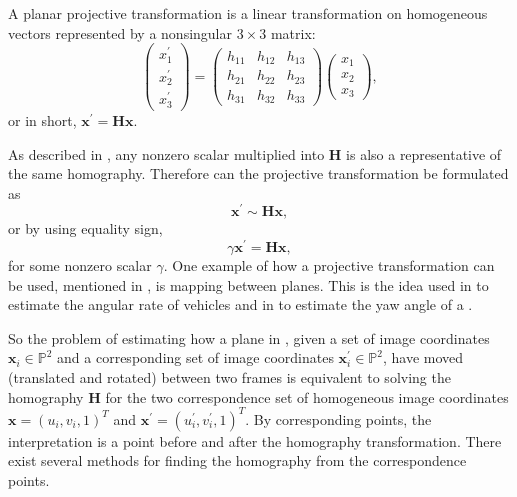 \begin{definition} \label{def:projtrans}
	A planar projective transformation is a linear transformation on homogeneous  vectors represented by a nonsingular $3 \times 3$ matrix:
	\begin{equation}
		\begin{pmatrix} x^\prime_1 \\ x^\prime_2 \\ x^\prime_3 \end{pmatrix}
		=
		\begin{pmatrix}
			h_{11} & h_{12} & h_{13} \\
			h_{21} & h_{22} & h_{23} \\
			h_{31} & h_{32} & h_{33}
		\end{pmatrix}
		\begin{pmatrix} x_1 \\ x_2 \\ x_3 \end{pmatrix},
	\end{equation}
	or in short, $\bm{x}^\prime = \bm{H} \bm{x}$.
\end{definition}
%
As described in \cite{Nordberg:2015}, any nonzero scalar multiplied into $\bm{H}$ is also a representative of the same homography.
Therefore can the projective transformation be formulated as
%
\begin{equation}
	\label{eq:homography}
	\bm{x}^\prime \sim \bm{H} \bm{x},
\end{equation}
%
or by using equality sign,
%
\begin{equation}
	\label{eq:homographyequality}
	\gamma \bm{x}^\prime = \bm{H} \bm{x},
\end{equation}
%
for some nonzero scalar $\gamma$.
One example of how a projective transformation can be used, mentioned in \cite{Hartley:2004}, is mapping between planes. 
This is the idea used in \cite{Gabb:2013} to estimate the angular rate of vehicles and in \cite{Mondragon:2010} to estimate the yaw angle of a \abbrUAV.

So the problem of estimating how a plane in , given a set of image coordinates $\bm{x}_i \in \mathbb{P}^2$ and a corresponding set of image coordinates $\bm{x}^\prime_i \in \mathbb{P}^2$, have moved (translated and rotated) between two frames is equivalent to solving the homography $\bm{H}$ for the two correspondence set of homogeneous image coordinates $\bm{x} = (u_i, v_i, 1)^T$ and $\bm{x}^\prime = (u^\prime_i, v^\prime_i, 1)^T$.
By corresponding points, the interpretation is a point before and after the homography transformation.
There exist several methods for finding the homography from the correspondence points.

